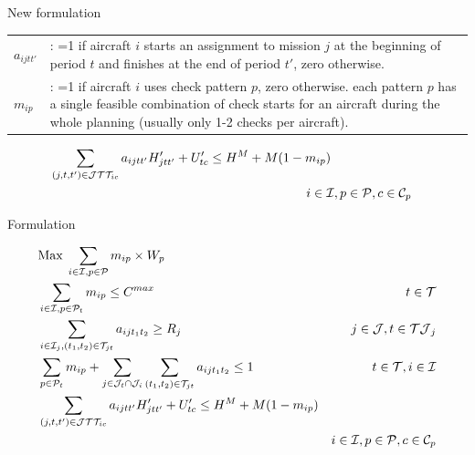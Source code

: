 \documentclass[usenames,dvipsnames]{beamer}
\begin{document}
\begin{frame}

\begin{block}{New formulation}

\begin{tabular}{p{15mm}p{110mm}}
  $a_{ijtt'}$ & : =1 if aircraft $i$ starts an assignment to mission $j$ at the beginning of period $t$ and finishes at the end of period $t'$, zero otherwise.  \\
  $m_{ip}$ &: =1 if aircraft $i$ uses check pattern $p$, zero otherwise.
 each pattern $p$ has a single feasible combination of check starts for an aircraft during the whole planning (usually only 1-2 checks per aircraft). \\
\end{tabular}

\begin{align}
  & \sum_{(j, t, t') \in \mathcal{J}\mathcal{T}\mathcal{T}_{ic}} a_{ijtt'} H^\prime_{jtt'} + U^{\prime}_{tc} \leq H^{M} + M (1 - m_{ip}) & \notag \\
  & \hspace{200px}  i \in \mathcal{I}, p \in \mathcal{P}, c \in \mathcal{C}_p \label{eq:cycle_hours2}\\
\end{align}

\end{block}

\end{frame}

\begin{frame}

\begin{block}{Formulation}

\begin{align}
  & \text{Max}\;
  \sum_{i \in \mathcal{I}, p \in \mathcal{P}} m_{ip} \times W_p \\
  & \sum_{i \in \mathcal{I}, p \in \mathcal{P}_{t}} m_{ip} \leq C^{max} 
          & t \in \mathcal{T} \label{eq:capacity1}\\
  & \sum_{i \in \mathcal{I}_j, (t_1, t_2) \in \mathcal{T}_{jt}} a_{ijt_1t_2} \geq R_j
          & j \in \mathcal{J}, t \in \mathcal{TJ}_j  \label{eq:missionres}\\
  & \sum_{p \in \mathcal{P}_{t}} m_{ip} + \sum_{j \in \mathcal{J}_t \cap \mathcal{J}_i} \sum_{(t_1, t_2) \in \mathcal{T}_{jt}} a_{ijt_1t_2} \leq 1 
          & t \in \mathcal{T}, i \in \mathcal{I} \label{eq:state}\\
  & \sum_{(j, t, t') \in \mathcal{J}\mathcal{T}\mathcal{T}_{ic}} a_{ijtt'} H^\prime_{jtt'} + U^{\prime}_{tc} \leq H^M + M (1 - m_{ip}) & \notag \\
    & & i \in \mathcal{I}, p \in \mathcal{P}, c \in \mathcal{C}_p \\
\end{align}

\end{block}

\end{frame}
\end{document}
